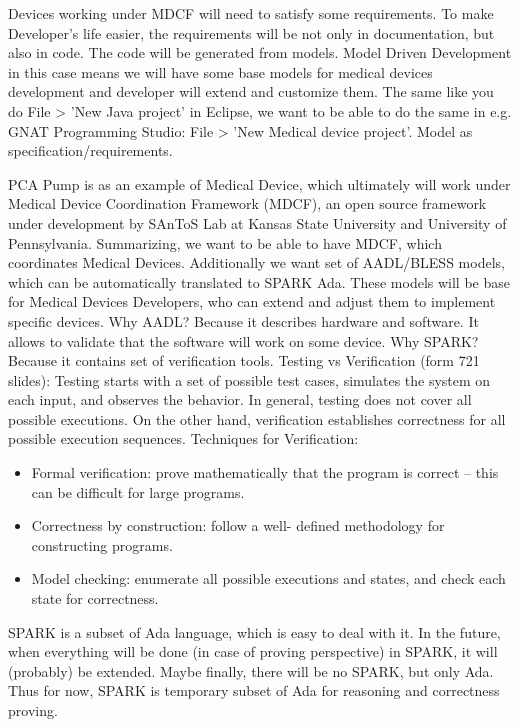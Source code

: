 Devices working under MDCF will need to satisfy some requirements. To make Developer's life easier, the requirements will be not only in documentation, but also in code. The code will be generated from models.
Model Driven Development in this case means we will have some base models for medical devices development and developer will extend and customize them. The same like you do File > 'New Java project' in Eclipse, we want to be able to do the same in e.g. GNAT Programming Studio: File > 'New Medical device project'.
Model as specification/requirements.

PCA Pump is as an example of Medical Device, which ultimately will work under Medical Device Coordination Framework (MDCF), an open source framework under development by SAnToS Lab at Kansas State University and University of Pennsylvania.
Summarizing, we want to be able to have MDCF, which coordinates Medical Devices. Additionally we want set of AADL/BLESS models, which can be automatically translated to SPARK Ada. These models will be base for Medical Devices Developers, who can extend and adjust them to implement specific devices. 
Why AADL? Because it describes hardware and software. It allows to validate that the software will work on some device.
Why SPARK? Because it contains set of verification tools. 
Testing vs Verification (form 721 slides): Testing starts with a set of possible test cases, simulates the system on each input, and observes the behavior. In general, testing does not cover all possible executions. On the other hand, verification establishes correctness for all possible execution sequences.
Techniques for Verification:
\begin{itemize}
	\item Formal verification: prove mathematically that the program is correct – this can be difficult for large programs.
	\item Correctness by construction: follow a well- defined methodology for constructing programs.
	\item Model checking: enumerate all possible executions and states, and check each state for correctness.
\end{itemize}
SPARK is a subset of Ada language, which is easy to deal with it. In the future, when everything will be done (in case of proving perspective) in SPARK, it will (probably) be extended. Maybe finally, there will be no SPARK, but only Ada. Thus for now, SPARK is temporary subset of Ada for reasoning and correctness proving.


